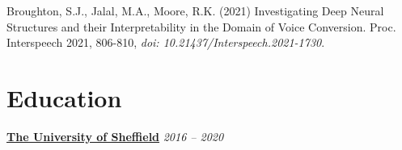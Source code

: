 \documentclass[10pt]{article} %
\begin{document}
\begin{changemargin}{0pt}{0.5pt}
\begin{minipage}[t]{0.44\textwidth}
\begin{thebibliography}{1}
	
	 Broughton, S.J., Jalal, M.A., Moore, R.K. (2021) Investigating Deep Neural Structures and their Interpretability in the Domain of Voice Conversion. Proc. Interspeech 2021, 806-810, \textit{doi: 10.21437/Interspeech.2021-1730}.
	
\end{thebibliography}


\section{Education}

\begin{changemargin}{1pt}{1pt}






\underline{\textbf{The University of Sheffield}} \hfill \textit{ 2016 --  2020}\\
\par
\vspace{-15pt}


\end{changemargin}
\end{minipage}
\end{changemargin}
\end{document}
